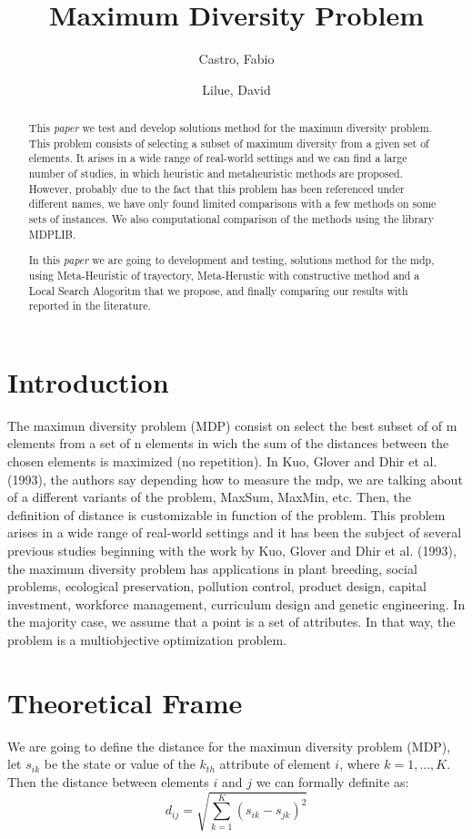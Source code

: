 \documentclass{ci5652}
\title{Maximum Diversity Problem}
\author{ Castro, Fabio
        \and
        Lilue, David}
\begin{document}
\thispagestyle{empty}
\maketitle

\begin{abstract}
This \textit{paper}  we test and develop solutions method for the maximun diversity problem. This problem consists of
selecting a subset of maximum diversity from a given set of elements. It arises in a wide
range of real-world settings and we can find a large number of studies, in which heuristic
and metaheuristic methods are proposed. However, probably due to the fact that this
problem has been referenced under different names, we have only found limited
comparisons with a few methods on some sets of instances.
We also computational comparison of the methods using the 
library MDPLIB.


In this \textit{paper}  we are going to development and testing, solutions method for the mdp, using Meta-Heuristic of trayectory, Meta-Herustic with constructive method and a Local Search Alogoritm that we propose, and finally comparing our results with reported in the literature.

\end{abstract}

\section{Introduction}
The maximun diversity problem (MDP) consist on select the best subset of of m elements
from a set of n elements in wich the sum of the distances between the chosen
elements is maximized (no repetition).  In Kuo, Glover and Dhir et al. (1993), the authors say depending how to measure the mdp, we are talking about of a different variants of the problem, MaxSum, MaxMin, etc. Then, the definition of distance is customizable in function of the problem. This problem arises in a wide range of real-world settings and it has been the subject of several previous studies beginning with the work by Kuo, Glover and Dhir et al. (1993), the maximum diversity problem has applications in plant breeding,
social problems, ecological preservation, pollution control, product design, capital
investment, workforce management, curriculum design and genetic engineering. In the majority case, we assume that a point is a set of attributes. In that way, the problem is a multiobjective optimization problem.


\section{Theoretical Frame}
We are going to define the distance for the maximun diversity problem (MDP), let  
{$s_{ik}$}
be the state or value of the {$k_{th}$} attribute of element {$i$}, where {$k = 1, ..., K$}. Then the distance between elements {$i$} and {$j$} we can formally definite as: 
\[  d_{ij}  =  \sqrt{ \sum_{k=1}^{K} (s_{ik}-s_{jk})^{2}}  \]
\end{document}
